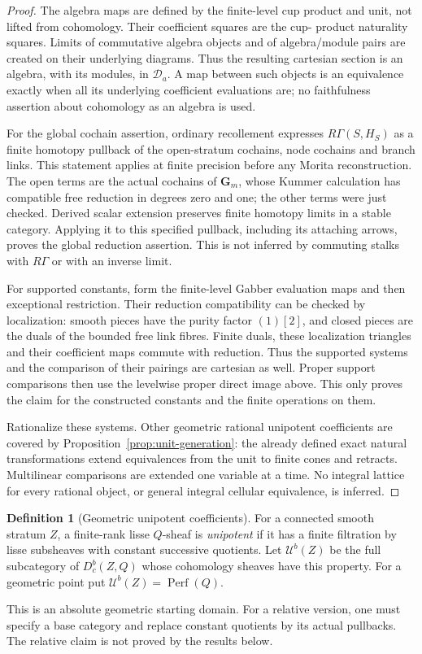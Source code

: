\documentclass[11pt]{article}
\theoremstyle{definition}
\newtheorem{definition}[theorem]{Definition}
\theoremstyle{remark}
\newcommand{\Perf}{\operatorname{Perf}}
\begin{document}
\begin{proof}
The algebra maps are defined by the finite-level cup product and unit,
not lifted from cohomology.  Their coefficient squares are the cup-
product naturality squares.  Limits of commutative algebra objects
and of algebra/module pairs are created on their underlying diagrams.
Thus the resulting cartesian section is an algebra, with its modules,
in $\mathcal D_a$.  A map between such objects is an equivalence
exactly when all its underlying coefficient evaluations are; no
faithfulness assertion about cohomology as an algebra is used.

For the global cochain assertion, ordinary recollement expresses
$R\Gamma(S,H_S)$ as a finite homotopy pullback of the open-stratum
cochains, node cochains and branch links.  This statement applies
at finite precision before any Morita reconstruction.  The open
terms are the actual cochains of $\mathbf G_m$, whose Kummer
calculation has compatible free reduction in degrees zero and one;
the other terms were just checked.  Derived scalar extension preserves
finite homotopy limits in a stable category.  Applying it to this
specified pullback, including its attaching arrows, proves the
global reduction assertion.  This is not inferred by commuting
stalks with $R\Gamma$ or with an inverse limit.

For supported constants, form the finite-level Gabber evaluation
maps and then exceptional restriction.  Their reduction compatibility
can be checked by localization: smooth pieces have the purity factor
$(1)[2]$, and closed pieces are the duals of the bounded free link
fibres.  Finite duals, these localization triangles and their
coefficient maps commute with reduction.  Thus the supported systems
and the comparison of their pairings are cartesian as well.  Proper
support comparisons then use the levelwise proper direct image
above.  This only proves the claim for the constructed constants
and the finite operations on them.

Rationalize these systems.  Other geometric rational unipotent
coefficients are covered by Proposition~\ref{prop:unit-generation}:
the already defined exact natural transformations extend equivalences
from the unit to finite cones and retracts.  Multilinear comparisons
are extended one variable at a time.  No integral lattice for every
rational object, or general integral cellular equivalence, is inferred.
\end{proof}

\begin{definition}[Geometric unipotent coefficients]
For a connected smooth stratum $Z$, a finite-rank lisse $Q$-sheaf is
\emph{unipotent} if it has a finite filtration by lisse subsheaves with
constant successive quotients.  Let $\mathcal U^b(Z)$ be the full
subcategory of $D_c^b(Z,Q)$ whose cohomology sheaves have this property.
For a geometric point put $\mathcal U^b(Z)=\Perf(Q)$.
\end{definition}
This is an absolute geometric starting domain.  For a relative version,
one must specify a base category and replace constant quotients by its
actual pullbacks.  The relative claim is not proved by the results below.
\end{document}
